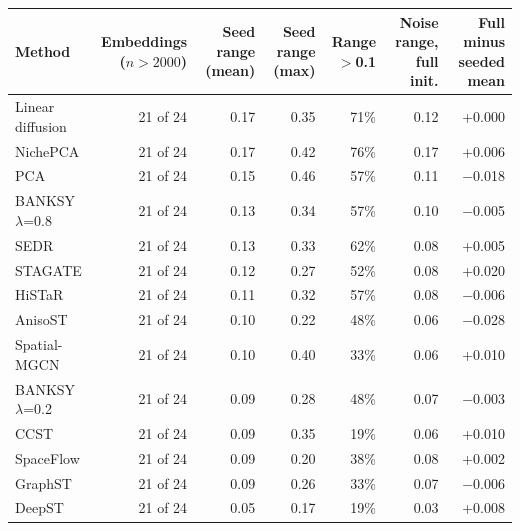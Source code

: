 \footnotesize
\begin{tabular}{lrrrrrr}
\toprule
Method & Embeddings ($n>2000$) & Seed range (mean) & Seed range (max) & Range $>$0.1 & Noise range, full init. & Full minus seeded mean \\
\midrule
Linear diffusion & 21 of 24 & 0.17 & 0.35 & 71\% & 0.12 & +0.000 \\
NichePCA & 21 of 24 & 0.17 & 0.42 & 76\% & 0.17 & +0.006 \\
PCA & 21 of 24 & 0.15 & 0.46 & 57\% & 0.11 & $-$0.018 \\
BANKSY $\lambda$=0.8 & 21 of 24 & 0.13 & 0.34 & 57\% & 0.10 & $-$0.005 \\
SEDR & 21 of 24 & 0.13 & 0.33 & 62\% & 0.08 & +0.005 \\
STAGATE & 21 of 24 & 0.12 & 0.27 & 52\% & 0.08 & +0.020 \\
HiSTaR & 21 of 24 & 0.11 & 0.32 & 57\% & 0.08 & $-$0.006 \\
AnisoST & 21 of 24 & 0.10 & 0.22 & 48\% & 0.06 & $-$0.028 \\
Spatial-MGCN & 21 of 24 & 0.10 & 0.40 & 33\% & 0.06 & +0.010 \\
BANKSY $\lambda$=0.2 & 21 of 24 & 0.09 & 0.28 & 48\% & 0.07 & $-$0.003 \\
CCST & 21 of 24 & 0.09 & 0.35 & 19\% & 0.06 & +0.010 \\
SpaceFlow & 21 of 24 & 0.09 & 0.20 & 38\% & 0.08 & +0.002 \\
GraphST & 21 of 24 & 0.09 & 0.26 & 33\% & 0.07 & $-$0.006 \\
DeepST & 21 of 24 & 0.05 & 0.17 & 19\% & 0.03 & +0.008 \\
\bottomrule
\end{tabular}
